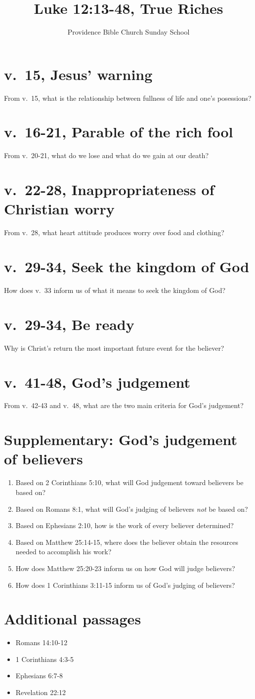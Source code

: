 \documentclass[12pt]{article}
\begin{document}
\title{Luke 12:13-48, True Riches}
\author{Providence Bible Church Sunday School}
\maketitle
\section*{v.~15, Jesus' warning}
From v.~15, what is the relationship between 
    fullness of life and one's posessions?
\section*{v.~16-21, Parable of the rich fool}
From v.~20-21, what do we lose and what do we gain at our death?
\section*{v.~22-28, Inappropriateness of Christian worry}
From v.~28, what heart attitude produces worry over food and clothing?
\section*{v.~29-34, Seek the kingdom of God}
How does v.~33 inform us of what it means to seek the kingdom of God?
\section*{v.~29-34, Be ready}
Why is Christ's return the most important future event for the believer?
\section*{v.~41-48, God's judgement}
From v.~42-43 and v.~48, what are the two main criteria for God's
    judgement?

\section*{Supplementary: God's judgement of believers}
\begin{enumerate}
\item Based on 2 Corinthians 5:10, 
    what will God judgement toward believers be based on?
\item Based on Romans 8:1, what will God's judging of believers \emph{not} 
    be based on?
\item Based on Ephesians 2:10, how is the work of every believer determined?
\item Based on Matthew 25:14-15, where does the believer obtain the resources
    needed to accomplish his work?
\item How does Matthew 25:20-23 inform us on how God will judge believers?
\item How does 1 Corinthians 3:11-15 inform us of God's judging of believers?
\end{enumerate}

\section*{Additional passages}
\begin{itemize}
\item Romans 14:10-12
\item 1 Corinthians 4:3-5
\item Ephesians 6:7-8
\item Revelation 22:12
\end{itemize}
\end{document}
